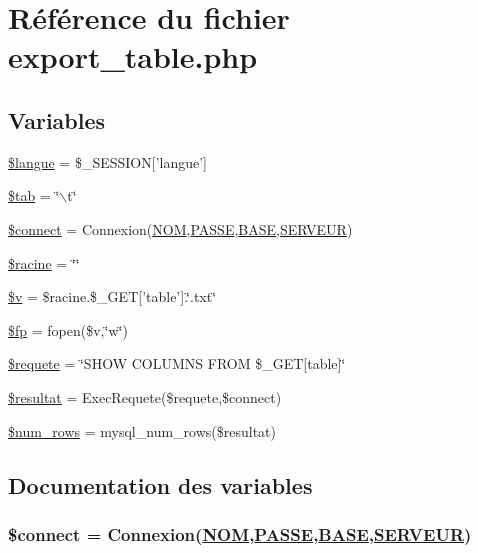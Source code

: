 \hypertarget{export__table_8php}{
\section{R\'{e}f\'{e}rence du fichier export\_\-table.php}
\label{export__table_8php}
}
\subsection*{Variables}
\begin{CompactItemize}
\item 
\hyperlink{export__table_8php_a0}{\$langue} = \$\_\-SESSION\mbox{[}'langue'\mbox{]}
\item 
\hyperlink{export__table_8php_a1}{\$tab} = \char`\"{}$\backslash$t\char`\"{}
\item 
\hyperlink{export__table_8php_a2}{\$connect} = Connexion(\hyperlink{pma__connect_8php_a0}{NOM},\hyperlink{pma__connect_8php_a1}{PASSE},\hyperlink{pma__connect_8php_a3}{BASE},\hyperlink{pma__connect_8php_a2}{SERVEUR})
\item 
\hyperlink{export__table_8php_a3}{\$racine} = \char`\"{}\char`\"{}
\item 
\hyperlink{export__table_8php_a4}{\$v} = \$racine.\$\_\-GET\mbox{[}'table'\mbox{]}.\char`\"{}.txt\char`\"{}
\item 
\hyperlink{export__table_8php_a5}{\$fp} = fopen(\$v,\char`\"{}w\char`\"{})
\item 
\hyperlink{export__table_8php_a6}{\$requete} = \char`\"{}SHOW COLUMNS FROM \$\_\-GET\mbox{[}table\mbox{]}\char`\"{}
\item 
\hyperlink{export__table_8php_a7}{\$resultat} = Exec\-Requete(\$requete,\$connect)
\item 
\hyperlink{export__table_8php_a8}{\$num\_\-rows} = mysql\_\-num\_\-rows(\$resultat)
\end{CompactItemize}


\subsection{Documentation des variables}
\hypertarget{export__table_8php_a2}{
\subsubsection[\$connect]{\setlength{\rightskip}{0pt plus 5cm}\$connect = Connexion(\hyperlink{pma__connect_8php_a0}{NOM},\hyperlink{pma__connect_8php_a1}{PASSE},\hyperlink{pma__connect_8php_a3}{BASE},\hyperlink{pma__connect_8php_a2}{SERVEUR})}}
\label{export__table_8php_a2}


